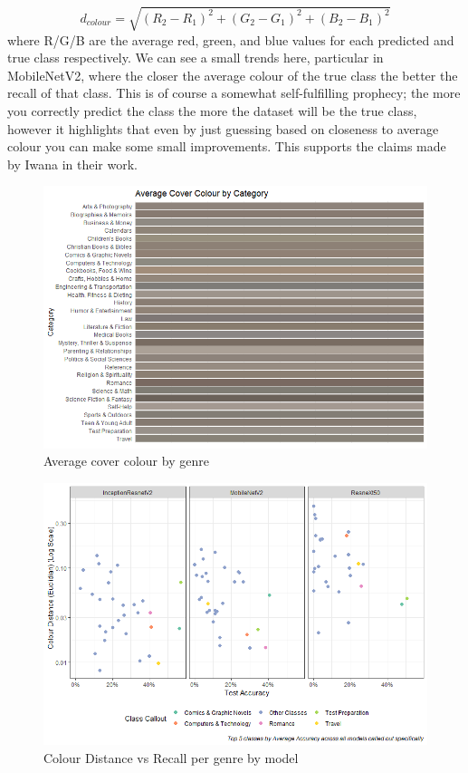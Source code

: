 \documentclass[12pt]{article}
\numberwithin{equation}{section}
\numberwithin{figure}{section}
\begin{document}
\begin{equation}
	d_{colour} = \sqrt{(R_2 - R_1)^2 + (G_2 - G_1)^2 +(B_2 - B_1)^2 }
\end{equation}
where R/G/B are the average red, green, and blue values for each predicted and true class respectively. We can see a small trends here, particular in MobileNetV2, where the closer the average colour of the true class the better the recall of that class. This is of course a somewhat self-fulfilling prophecy; the more you correctly predict the class the more the dataset will be the true class, however it highlights that even by just guessing based on closeness to average colour you can make some small improvements. This supports the claims made by Iwana in their work. 


\begin{figure}
	\centering
	\captionsetup{justification=centering}
	\includegraphics[scale=0.45]{avg_col_plot.png}
	\caption{Average cover colour by genre}
	\label{fig:avg_col}
\end{figure}

\begin{figure}
	\centering
	\captionsetup{justification=centering}
	\includegraphics[scale=0.6]{col_dist_plot.png}
	\caption{Colour Distance vs Recall per genre by model}
	\label{fig:col_distance}
\end{figure}
\end{document}
